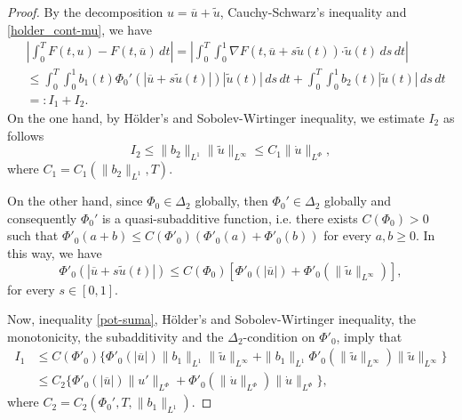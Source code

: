 \documentclass[twoside]{article}
\theoremstyle{remark}
\newcommand{\orlnor}{\|_{L^{\Phi}}}
\renewcommand{\b}[1]{\boldsymbol{#1}}
\newcommand{\ccdot}{\b{\cdot}}
\renewcommand{\leq}{\leqslant}
\renewcommand{\geq}{\geqslant}
\begin{document}
\begin{proof}
By the decomposition $u=\overline{u}+\tilde{u}$,   Cauchy-Schwarz's inequality
and \eqref{holder_cont-mu}, we have
\begin{equation}\label{cota-diferencia-F}
\begin{split}
&\left|\int_0^T F(t,u)-F(t,\overline{u})\,dt\right|=
\left|\int_0^T \int_0^1 \nabla F(t,\overline{u}+s\tilde{u}(t))\ccdot \tilde{u}(t) \,ds \,dt\right|
\\
&\leq \int_0^T \int_0^1 b_1(t)\Phi_0'(|\overline{u}+s\tilde{u}(t)|)|\tilde{u}(t)|\,ds\,dt+
\int_0^T \int_0^1 b_2(t)|\tilde{u}(t)|\,ds\,dt
\\
&=:I_1+I_2.
\end{split}
\end{equation}
On the one hand, by H\"older's and Sobolev-Wirtinger inequality, we estimate $I_2$ as follows
\begin{equation}\label{cota-i2}
I_2\leq \|b_2\|_{L^1} \|\tilde{u}\|_{L^{\infty}}\leq
C_1\|\dot{u}\orlnor,
\end{equation}
 where $C_1=C_1(\|b_2\|_{L^1}, T)$. 

On the other hand, since $\Phi_0 \in \Delta_2$ globally, then $\Phi_0' \in \Delta_2$ globally and
consequently $\Phi_0'$ is a quasi-subadditive function, i.e. there exists $C(\Phi_0)>0$ such that
$\Phi'_0(a+b)\leq C(\Phi'_0)(\Phi'_0(a)+\Phi'_0(b))$ for every $a,b\geq 0$.
In this way, we have
\begin{equation}\label{pot-suma}
\Phi'_0(|\overline{u}+s\tilde{u}(t)|)\leq
C(\Phi_0)[\Phi'_0(|\overline{u}|)+\Phi'_0(\|\tilde{u}\|_{L^{\infty}})],
\end{equation}
for every $s \in [0,1]$. 

Now,  inequality \eqref{pot-suma}, H\"older's and Sobolev-Wirtinger inequality,
 the monotonicity, the subadditivity and  the $\Delta_2$-condition on $\Phi'_0$, imply that
\begin{equation}\label{cota-i1}
\begin{split}
I_1&
\leq C(\Phi'_0)\bigg\{ \Phi'_0(|\overline{u}|) \|b_1\|_{L^1} \|\tilde{u}\|_{L^{\infty}}+
 \|b_1\|_{L^1}\Phi'_0(\|\tilde{u}\|_{L^\infty})\|\tilde{u}\|_{L^\infty}\bigg\}
\\
&\leq C_2 \bigg\{ \Phi'_0(|\overline{u}|) \|u'\orlnor
+\Phi'_0(\|\dot{u}\orlnor) \|\dot{u}\orlnor\bigg\},
\end{split}
\end{equation}
where $C_2=C_2(\Phi_0',T, \|b_1\|_{L^1} )$.


\end{proof}
\end{document}
